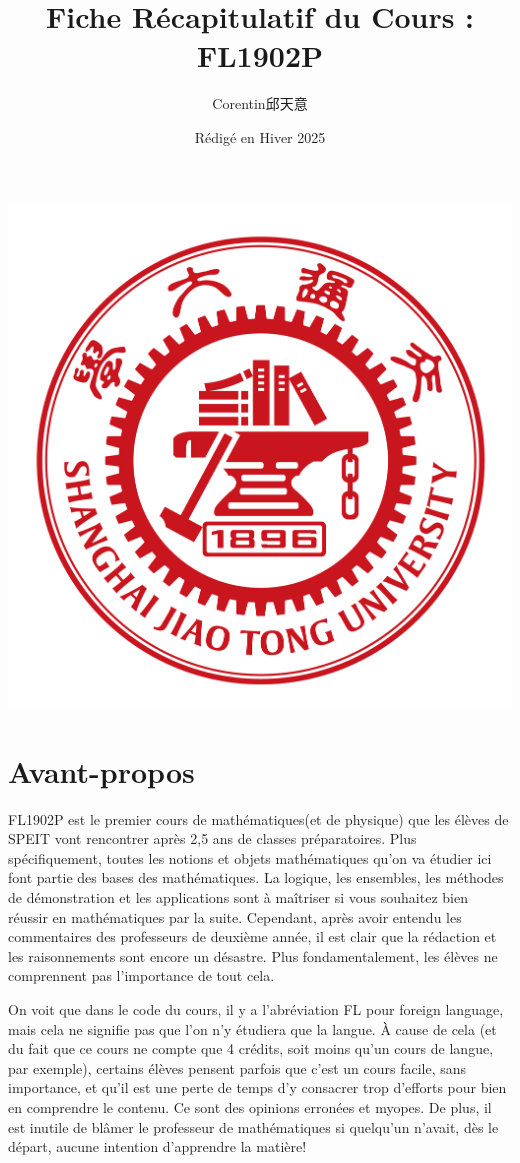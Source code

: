 \documentclass{article}
\title{\textbf{Fiche Récapitulatif du Cours :\\ FL1902P}}
\author{Corentin邱天意}
\date{Rédigé en Hiver 2025}
\begin{document}
\maketitle

\centerline{\includegraphics[scale=0.4]{sjtu}}

\newpage

\section*{Avant-propos}

FL1902P est le premier cours de mathématiques(et de physique) que les élèves de SPEIT vont rencontrer après 2,5 ans de classes préparatoires. Plus spécifiquement, toutes les notions et objets mathématiques qu'on va étudier ici font partie des bases des mathématiques. La logique, les ensembles, les méthodes de démonstration et les applications sont à maîtriser si vous souhaitez bien réussir en mathématiques par la suite. Cependant, après avoir entendu les commentaires des professeurs de deuxième année, il est clair que la rédaction et les raisonnements sont encore un désastre. Plus fondamentalement, les élèves ne comprennent pas l’importance de tout cela.

On voit que dans le code du cours, il y a l’abréviation FL pour foreign language, mais cela ne signifie pas que l’on n’y étudiera que la langue. À cause de cela (et du fait que ce cours ne compte que 4 crédits, soit moins qu’un cours de langue, par exemple), certains élèves pensent parfois que c’est un cours facile, sans importance, et qu’il est une perte de temps d’y consacrer trop d’efforts pour bien en comprendre le contenu. Ce sont des opinions erronées et myopes. De plus, il est inutile de blâmer le professeur de mathématiques si quelqu’un n’avait, dès le départ, aucune intention d’apprendre la matière!
\end{document}
